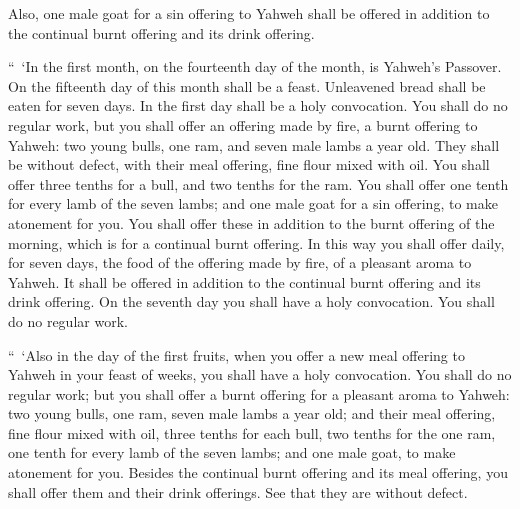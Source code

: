 {Also, one male goat for a sin offering to Yahweh shall be offered in addition to the continual burnt offering and its drink offering.
\par }{\PP {}“ ‘In the first month, on the fourteenth day of the month, is Yahweh’s Passover.
On the fifteenth day of this month shall be a feast. Unleavened bread shall be eaten for seven days.
In the first day shall be a holy convocation. You shall do no regular work,
but you shall offer an offering made by fire, a burnt offering to Yahweh: two young bulls, one ram, and seven male lambs a year old. They shall be without defect,
with their meal offering, fine flour mixed with oil. You shall offer three tenths for a bull, and two tenths for the ram.
You shall offer one tenth for every lamb of the seven lambs;
and one male goat for a sin offering, to make atonement for you.
You shall offer these in addition to the burnt offering of the morning, which is for a continual burnt offering.
In this way you shall offer daily, for seven days, the food of the offering made by fire, of a pleasant aroma to Yahweh. It shall be offered in addition to the continual burnt offering and its drink offering.
On the seventh day you shall have a holy convocation. You shall do no regular work.
\par }{\PP {}“ ‘Also in the day of the first fruits, when you offer a new meal offering to Yahweh in your feast of weeks, you shall have a holy convocation. You shall do no regular work;
but you shall offer a burnt offering for a pleasant aroma to Yahweh: two young bulls, one ram, seven male lambs a year old;
and their meal offering, fine flour mixed with oil, three tenths for each bull, two tenths for the one ram,
one tenth for every lamb of the seven lambs;
and one male goat, to make atonement for you.
Besides the continual burnt offering and its meal offering, you shall offer them and their drink offerings. See that they are without defect.

}
